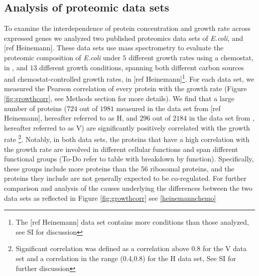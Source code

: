 \documentclass[notitlepage]{article}
\begin{document}
\subsection{Analysis of proteomic data sets}
To examine the interdependence of protein concentration and growth rate across expressed genes we analyzed two published proteomics data sets of \emph{E.coli}, \parencite{Valgepea2013} and [ref Heinemann].
These data sets use mass spectrometry to evaluate the proteomic composition of \emph{E.coli} under $5$ different growth rates using a chemostat, in \parencite{Valgepea2013}, and $13$ different growth conditions, spanning both different carbon sources and chemostat-controlled growth rates, in [ref Heinemann]\footnote{The [ref Heinemann] data set contains more conditions than those analyzed, see SI for discussion}.
For each data set, we measured the Pearson correlation of every protein with the growth rate (Figure \ref{fig:growthcorr}, see Methods section for more details).
We find that a large number of proteins ($724$ out of $1981$ measured in the data set from [ref Heinemann], hereafter referred to as H, and $296$ out of $2184$ in the data set from \parencite{Valgepea2013}, hereafter referred to as V) are significantly positively correlated with the growth rate \footnote{Significant correlation was defined as a correlation above 0.8 for the V data set and a correlation in the range (0.4,0.8) for the H data set, See SI for further discussion}.
Notably, in both data sets, the proteins that have a high correlation with the growth rate are involved in different cellular functions and span different functional groups (To-Do refer to table with breakdown by function).
Specifically, these groups include more proteins than the 56 ribosomal proteins, and the proteins they include are not generally expected to be co-regulated.
For further comparison and analysis of the causes underlying the differences between the two data sets as reflected in Figure \ref{fig:growthcorr} see \ref{heinemannchemo}
\end{document}
